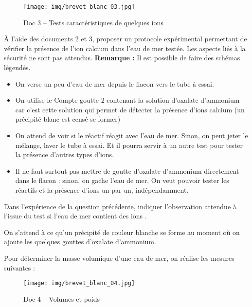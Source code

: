 \documentclass[answers]{exam}
\begin{document}
\begin{figure}[H]
  \centering
  \texttt{[image: img/brevet\_blanc\_03.jpg]}
  \captionsetup{labelformat=empty}
  \caption{\label{} Doc 3 – Tests caractéristiques de quelques ions}
\end{figure} 

\begin{questions}
  \question[2] À l'aide des documents 2 et 3, proposer un protocole expérimental permettant de vérifier la présence de l'ion calcium  dans l'eau de mer testée. Les aspects liés à la sécurité ne sont pas attendus. \textbf{Remarque :} Il est possible de faire des schémas légendés.
  \begin{solution}
    \begin{itemize}
    \item On verse un peu d'eau de mer depuis le flacon vers le tube à essai. 
    \item On utilise le Compte-goutte 2 contenant la solution d'oxalate d'ammonium car c'est cette solution qui permet de détecter la présence d'ions calcium  (un précipité blanc est censé se former)
    \item On attend de voir si le réactif réagit avec l'eau de mer. Sinon, on peut jeter le mélange, laver le tube à essai. Et il pourra servir à un autre test pour tester la présence d'autres types d'ions.
    \item Il ne faut surtout pas mettre de goutte d'oxalate d'ammonium directement dans le flacon : sinon, on gache l'eau de mer. On veut pouvoir tester les réactifs et la présence d'ions un par un, indépendamment. 
    \end{itemize}
  \end{solution}
  \question[1] Dans l'expérience de la question précédente, indiquer l'observation attendue à l'issue du test si l'eau de mer contient des ions .
  \begin{solution}
  On s'attend à ce qu'un précipité de couleur blanche se forme au moment où on ajoute les quelques gouttes d'oxalate d'ammonium.
  \end{solution}
\end{questions}

Pour déterminer la masse volumique d'une eau de mer, on réalise les mesures suivantes :

\begin{figure}[H]
  \centering
  \texttt{[image: img/brevet\_blanc\_04.jpg]}
  \captionsetup{labelformat=empty}
  \caption{\label{} Doc 4 – Volumes et poids}
\end{figure} 
\end{document}
